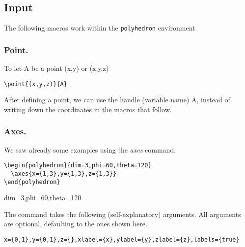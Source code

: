 \documentclass[a4paper,10pt]{article}
\begin{document}
\subsection{Input}

The following macros work within the \texttt{polyhedron} environment.

\subsubsection{Point.} To let A be a point (x,y) or (x,y,z)
\begin{lstlisting}
\point{(x,y,z)}{A}
\end{lstlisting}
After defining a point, we can use the handle (variable name) A, instead of
writing down the coordinates in the macros that follow.


\subsubsection{Axes.}

We saw already some examples using the \emph{axes} command.

\begin{center}
  \begin{minipage}{0.6\textwidth}
  \begin{lstlisting}
\begin{polyhedron}{dim=3,phi=60,theta=120}
  \axes{x={1,3},y={1,3},z={1,3}}
\end{polyhedron}
  \end{lstlisting}
  \end{minipage}
  \qquad\qquad
  \begin{minipage}{0.2\textwidth}
    \begin{polyhedron}{dim=3,phi=60,theta=120}
    \end{polyhedron}
  \end{minipage}
\end{center}

The command takes the following (self-explanatory) arguments.
All arguments are optional, defaulting to the ones shown here.

\begin{lstlisting}
x={0,1},y={0,1},z={},xlabel={x},ylabel={y},zlabel={z},labels={true}
\end{lstlisting}
\end{document}
